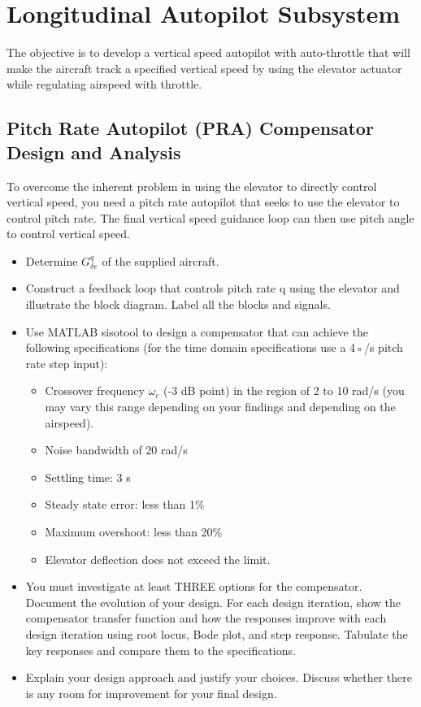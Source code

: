\section{Longitudinal Autopilot Subsystem}

The objective is to develop a vertical speed autopilot with auto-throttle that will make
the aircraft track a specified vertical speed by using the elevator actuator while regulating
airspeed with throttle.

\subsection{Pitch Rate Autopilot (PRA) Compensator Design and Analysis}

To overcome the inherent problem in using the elevator to directly control vertical speed, you need a pitch rate autopilot that seeks to use the elevator to control pitch rate. The final vertical speed guidance loop can then use pitch angle to control vertical speed.
\begin{itemize}
\item Determine $G^{q}_{\delta e}$ of the supplied aircraft.
\item Construct a feedback loop that controls pitch rate q using the elevator and illustrate the block diagram. Label all the blocks and signals.
\item Use MATLAB sisotool to design a compensator that can achieve the following
specifications (for the time domain specifications use a 4◦/s pitch rate step input):
\begin{itemize}
\item Crossover frequency $\omega_c$ (-3 dB point) in the region of 2 to 10 rad/s (you may
vary this range depending on your findings and depending on the airspeed).
\item Noise bandwidth of 20 rad/s
\item Settling time: 3 s
\item Steady state error: less than 1\%
\item Maximum overshoot: less than 20\%
\item Elevator deflection does not exceed the limit.
\end{itemize}
\item You must investigate at least THREE options for the compensator. Document the evolution of your design. For each design iteration, show the compensator transfer function and how the responses improve with each design iteration using root locus, Bode plot, and step response. Tabulate the key responses and compare them to the specifications.
\item Explain your design approach and justify your choices. Discuss whether there is any room for improvement for your final design.
\end{itemize}

